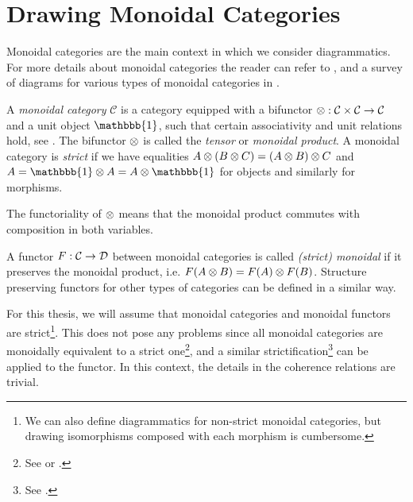 \section{Drawing Monoidal Categories}
\label{sec:monoidal-cat}

Monoidal categories are the main context in which we consider diagrammatics. For more details about monoidal categories the reader can refer to \cite{tensor-categories}, and a survey of diagrams for various types of monoidal categories in \cite{selinger-survey-of-graphical-monoidal-categories}.

\begin{definition}
    A \textit{monoidal category} $\mathcal{C}$ is a category equipped with a bifunctor $\otimes: \mathcal{C} \times \mathcal{C} \to \mathcal{C}$ and a unit object $\mathbbb{1}$, such that certain associativity and unit relations hold, see \cite[Definition 2.1.1, 2.2.8]{tensor-categories}. The bifunctor $\otimes$ is called the \textit{tensor} or \textit{monoidal product}. A monoidal category is \textit{strict} if we have equalities $A \otimes (B \otimes C) = (A \otimes B) \otimes C$ and $A = \mathbbb{1} \tensor A = A \tensor \mathbbb{1}$ for objects and similarly for morphisms.
\end{definition}

The functoriality of $\otimes$ means that the monoidal product commutes with composition in both variables.

\begin{definition}
    A functor $F: \mathcal{C} \to \mathcal{D}$ between monoidal categories is called \textit{(strict) monoidal} if it preserves the monoidal product, i.e. $F(A \otimes B) = F(A) \otimes F(B)$. Structure preserving functors for other types of categories can be defined in a similar way.
\end{definition}

For this thesis, we will assume that monoidal categories and monoidal functors are strict\footnote{We can also define diagrammatics for non-strict monoidal categories, but drawing isomorphisms composed with each morphism is cumbersome.}. This does not pose any problems since all monoidal categories are monoidally equivalent to a strict one\footnote{See \cite[\nopp VII.2]{maclane-category-theory} or \cite[Theorem 2.8.5]{tensor-categories}.}, and a similar strictification\footnote{See \cite{power-general-coherence}.} can be applied to the functor. In this context, the details in the coherence relations are trivial.

